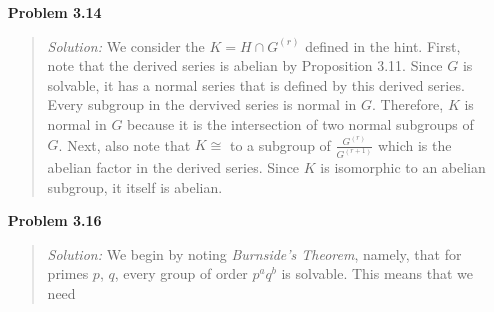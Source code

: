 \documentclass{article}
\newcommand{\Solution}{\textit{Solution: }}
\begin{document}
\begin{enumerate}
\begin{quote}
\begin{itemize}
\begin{quote}
                    $G/Z(G)$ is nilpotent.
                    ($\Leftarrow$) If there is a $H_m/Z(G) = G/Z(G)$ in the central series of $G/Z(G)$ then $H_m = G$ which is in the central series of $G$. This means that $G$ is nilpotent as well.
                \end{quote}
                \item \Solution We begin by noting the lemma that if $|N| \leq |Z(G)|$ and $G/N$ is nilpotent, then $G$ is nilpotent. We now prove this by induction on the order of $G$. If $|G| = 1$ then $G = e$ which is trivially nilpotent.
                Now, assume that all p-groups of order $< n$ are nilpotent. Since $G$ is a nontrivial p-group, $Z(G)$ is nontrivial as well. Since $Z(G)$ is abelian, it is nilpotent. Also, we know that $G/Z(G)$ is nilpotent by the inductive 
                hypothesis. Since both $Z(G)$ and $G/Z(G)$ are nilpotent, $G$ is nilpotent.  
                \item \Solution We note that another definition for a nilpotent group is that $G^{(i)} = e$ for some $i$. (Theorem 4 here: \url{http://people.math.binghamton.edu/mazur/teach/50305/5236.pdf}). Now, we just note that the definition of 
                a solvable group is that its derived series ends with the identity. 
                \item \Solution $A_4$ is a solvable group that is not nilpotent.
            \end{itemize} \qed
        \end{quote}
        \item[\textbf{Problem 3.14}]
        \begin{quote}
            \Solution We consider the $K = H \cap G^{(r)}$ defined in the hint. First, note that the derived series is abelian by Proposition 3.11. Since $G$ is solvable, it has a normal series that is defined by this derived series. 
            Every subgroup in the dervived series is normal in $G$. Therefore, $K$ is normal in $G$ because it is the intersection of two normal subgroups of $G$. Next, also note that $K \cong$ to a subgroup of $\frac{G^{(r)}}{G^{(r + 1)}}$ which is the 
            abelian factor in the derived series. Since $K$ is isomorphic to an abelian subgroup, it itself is abelian. \qedsymbol
        \end{quote}
        \item[\textbf{Problem 3.16}]
        \begin{quote}                
            \Solution We begin by noting \textit{Burnside's Theorem}, namely, that for primes $p$, $q$, every group of order $p^aq^b$ is solvable. This means that we need 

\end{quote}
\end{enumerate}
\end{document}
